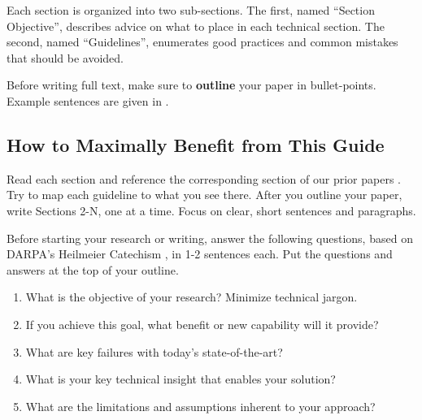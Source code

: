 Each section is organized into two sub-sections.
The first, named ``Section Objective'', describes advice on what to place in each technical section. The second, named ``Guidelines'', enumerates good practices and common mistakes that should be avoided.

Before writing full text, make sure to \textbf{outline} your paper in bullet-points.
Example sentences are given in .

\subsection{How to Maximally Benefit from This Guide}
Read each section and reference the corresponding section of our prior papers \cite{chinchali2021network,nakanoya2021task,ChinchaliSharmaEtAl2019}.
Try to map each guideline to what you see there. After you outline your paper, write Sections 2-N, one at a time. 
Focus on clear, short sentences and paragraphs. 

Before starting your research or writing, answer the following questions, based on DARPA's Heilmeier Catechism \cite{darpa}, in 1-2 sentences each. Put the questions and answers at the top of your outline.

\begin{enumerate}

\item What is the objective of your research? Minimize technical jargon.

\item If you achieve this goal, what benefit or new capability will it provide?

\item What are key failures with today's state-of-the-art?

\item What is your key technical insight that enables your solution?

\item What are the limitations and assumptions inherent to your approach?

\end{enumerate}
